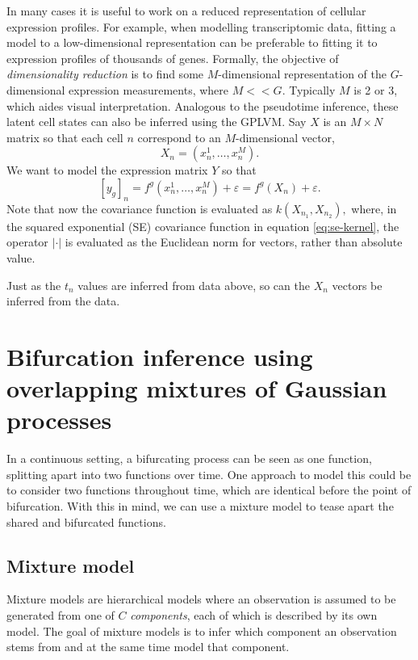 In many cases it is useful to work on a reduced representation of cellular expression profiles. For example, when modelling transcriptomic data, fitting a model to a low-dimensional representation can be preferable to fitting it to expression profiles of thousands of genes. Formally, the objective of \textit{dimensionality reduction} is to find some $ M $-dimensional representation of the $ G $-dimensional expression measurements, where $ M << G $. Typically $ M $ is 2 or 3, which aides visual interpretation. Analogous to the pseudotime inference, these latent cell states can also be inferred using the GPLVM. Say $ X $ is an $ M \times N $ matrix so that each cell $ n $ correspond to an $ M $-dimensional vector,
\[ X_n = (x^1_n, \ldots, x^M_n). \]
We want to model the expression matrix $ Y $ so that
\[ [y_g]_n = f^g(x^1_n, \ldots, x^M_n) + \varepsilon = f^g(X_n) + \varepsilon. \]
Note that now the covariance function is evaluated as $ k(X_{n_1}, X_{n_2}), $ where, in the squared exponential (SE) covariance function in equation \ref{eq:se-kernel}, the operator $ | \cdot | $ is evaluated as the Euclidean norm for vectors, rather than absolute value.

Just as the $ t_n $ values are inferred from data above, so can the $ X_n $ vectors be inferred from the data.

\section{Bifurcation inference using overlapping mixtures of Gaussian processes}
\label{sec:bif_method}

In a continuous setting, a bifurcating process can be seen as one function, splitting apart into two functions over time. One approach to model this could be to consider two functions throughout time, which are identical before the point of bifurcation. With this in mind, we can use a mixture model to tease apart the shared and bifurcated functions.

\subsection{Mixture model}

Mixture models are hierarchical models where an observation is assumed to be generated from one of $ C $ \textit{components}, each of which is described by its own model. The goal of mixture models is to infer which component an observation stems from and at the same time model that component.

